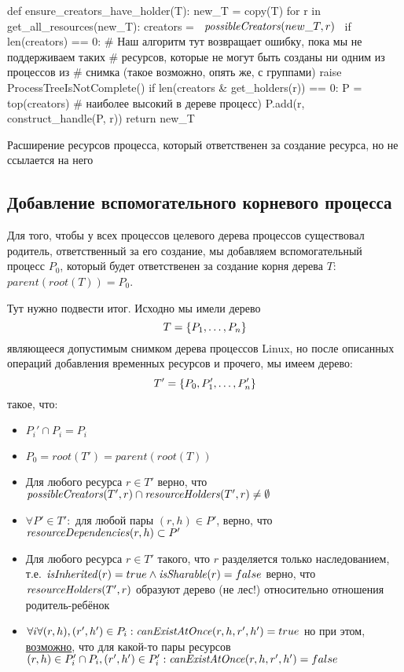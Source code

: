 \begin{listing}
\begin{pythoncode}
def ensure_creators_have_holder(T):
    new_T = copy(T)
    for r in get_all_resources(new_T):
        creators = ~$\possibleCreators{new\_T}{r}$~
        if len(creators) == 0:
           # Наш алгоритм тут возвращает ошибку, пока мы не поддерживаем таких
           # ресурсов, которые не могут быть созданы ни одним из процессов из
           # снимка (такое возможно, опять же, с группами)
           raise ProcessTreeIsNotComplete()
        if len(creators & get_holders(r)) == 0:
            P = top(creators)  # наиболее высокий в дереве процесс)
            P.add(r, construct_handle(P, r))
    return new_T
\end{pythoncode}
\caption{Расширение ресурсов процесса, который ответственен за создание ресурса, но не ссылается на него}
\end{listing}

\subsection{Добавление вспомогательного корневого процесса}

Для того, чтобы у всех процессов целевого дерева процессов существовал родитель, ответственный за его создание, мы добавляем вспомогательный процесс $P_0$, который будет ответственен за создание корня дерева $T$: $parent(root(T)) = P_0$.

Тут нужно подвести итог. Исходно мы имели дерево 
\begin{equation*}
T = \left\lbrace P_1, \ldots, P_n \right\rbrace
\end{equation*} 
являющееся допустимым снимком дерева процессов Linux, но после описанных операций добавления временных ресурсов и прочего, мы имеем дерево:
\begin{equation*}
T' = \left\lbrace P_0, P_1', \ldots, P_n' \right\rbrace
\end{equation*}
такое, что:

\begin{itemize}
	\item $P_i' \cap P_i = P_i$
	\item $P_0 = root(T') = parent(root(T))$
	\item Для любого ресурса $r \in T'$ верно, что $\text{\textit{possibleCreators}}(T', r) \cap \text{\textit{resourceHolders}}(T', r) \neq \emptyset$
	\item $\forall P' \in T': $ для любой пары $(r, h) \in P'$, верно, что $\text{\textit{resourceDependencies}}(r, h) \subset P'$
	\item Для любого ресурса $r \in T'$ такого, что $r$ разделяется только наследованием, т.е. $\text{\textit{isInherited}}(r) = true \land \text{\textit{isSharable}}(r) = false$ верно, что $\text{\textit{resourceHolders}}(T', r)$ образуют дерево (не лес!) относительно отношения родитель-ребёнок
	\item $\forall i \forall (r, h), (r', h') \in P_i: \text{\textit{canExistAtOnce}}(r, h, r', h') = true$ но при этом, \underline{возможно}, что для какой-то пары ресурсов $(r, h) \in P_i' \cap P_i, (r', h') \in P_i': \text{\textit{canExistAtOnce}}(r, h, r', h') = false$
\end{itemize}

